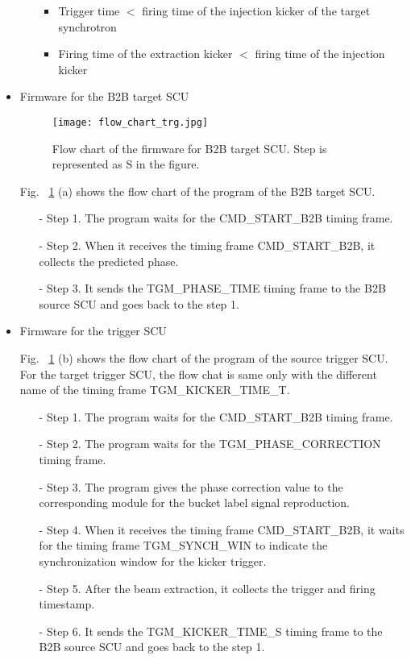 \begin{itemize}
\begin{itemize}
\begin{itemize}
	\item Trigger time $<$ firing time of the injection kicker of the target synchrotron

	\item Firing time of the extraction kicker $<$ firing time of the injection kicker
\end{itemize}
 

	\end{itemize}
\item Firmware for the B2B target SCU
\begin{figure}[H]
   \centering   
   \texttt{[image: flow\_chart\_trg.jpg]}
   \caption{Flow chart of the firmware for B2B target SCU. Step is represented as S in the figure.}
   \label{flow_chart_trg}
\end{figure}
Fig. ~\ref{flow_chart_trg} (a) shows the flow chart of the program of the B2B target SCU.
 	\begin{itemize}
		\item[-]Step 1. The program waits for the CMD\_START\_B2B timing frame.
 		\item[-]Step 2. When it receives the timing frame CMD\_START\_B2B, it collects the predicted phase.
		\item[-]Step 3. It sends the TGM\_PHASE\_TIME timing frame to the B2B source SCU and goes back to the step 1.
	\end{itemize}
\item Firmware for the trigger SCU

Fig. ~\ref{flow_chart_trg} (b) shows the flow chart of the program of the source trigger SCU. For the target trigger SCU, the flow chat is same only with the different name of the timing frame TGM\_KICKER\_TIME\_T.
 	\begin{itemize}
		\item[-]Step 1. The program waits for the CMD\_START\_B2B timing frame.
		\item[-]Step 2. The program waits for the TGM\_PHASE\_CORRECTION timing frame.
		\item[-]Step 3. The program gives the phase correction value to the corresponding module for the bucket label signal reproduction.
 		\item[-]Step 4. When it receives the timing frame CMD\_START\_B2B, it waits for the timing frame TGM\_SYNCH\_WIN to indicate the synchronization window for the kicker trigger.
		\item[-]Step 5. After the beam extraction, it collects the trigger and firing timestamp. 
		\item[-]Step 6. It sends the TGM\_KICKER\_TIME\_S timing frame to the B2B source SCU and goes back to the step 1.
	\end{itemize}

\end{itemize}
